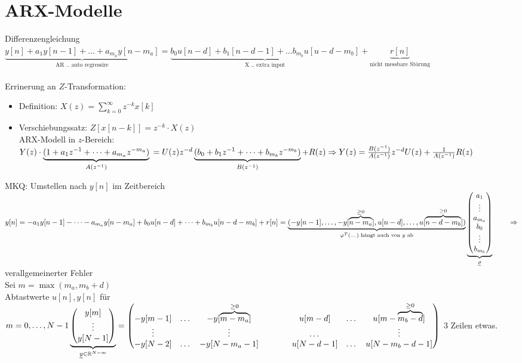 \documentclass[ngerman]{tudscrreprt}
\begin{document}
\section{ARX-Modelle} 
Differenzengleichung \\$\underbrace{y[n] + a_1 y[n-1] + \dots + a_{m_a} y [n-m_a]}_{\text{AR .. auto regressire}} = \underbrace{b_0 u [n-d] + b_1 [n-d -1] + \dots b_{m_b} u[u-d-m_b]}_{\text{X .. extra input}} + \underbrace{r[n]}_{\text{nicht messbare Störung}}$\\
\\Errinerung an $Z$-Transformation:
\begin{itemize}
\item Definition: $X(z) = \sum\limits_{k=0}^{\infty} z^{-k} x[k]$
\item Verschiebungssatz: $Z[x[n-k]] = z^{-k} \cdot X(z)$\\
ARX-Modell in $z$-Bereich: $Y(z)\cdot \underbrace{(1+ a_1 z^{-1} + \dots + a_{m_a} z^{-m_a})}_{A(z^{-1})}\\ =U(z) z^{-d} \underbrace{(b_0 + b_1 z^{-1} + \dots + b_{m_b} z^{-m_b})}_{B(z^{-1})} + R(z) \\ 
\Rightarrow Y(z) = \frac{B(z^{-1})}{A(z^{-1})} z^{-d} U(z) + \frac{1}{A(z^{-1})} R(z)$
\end{itemize}
MKQ: Umstellen nach $y[n]$ im Zeitbereich \\
$y[n] = -a_1 y[n-1] - \dots - a_{m_a} y [n-m_a] + b_0 u[n-d] + \dots + b_{m_b} u [n-d-m_b] + r[n] \\
= \underbrace{(-y[n-1],\dots, -y[\overbrace{n-m_a}^{\ge 0}],u[n-d],\dots, u[\overbrace{n-d-m_b}^{\ge 0}])}_{\varphi^T(\dots) \text{ hängt auch von $y$ ab}}
\underbrace{ 
\begin{pmatrix}
a_1\\
\vdots\\
a_{m_a}\\
b_0\\
\vdots\\
b_{m_b}
\end{pmatrix}}_{\underline \rho} \\
\qquad \Rightarrow$ verallgemeinerter Fehler\\
Sei $m = \max(m_a , m_b + d)$\\Abtastwerte $u[n], y[n]$ für $ m=0,\dots, N-1 \\
\underbrace{\begin{pmatrix}
y[m]\\
\vdots\\
y[N-1]
\end{pmatrix}}_{\underline y \in \mathbb{R}^{N-m}}=
\begin{pmatrix}
-y[m-1] &\dots& -y[\overbrace{m-m_a}^{\ge 0}] &\qquad& u[m-d] &\dots & u[m-\overbrace{m_b-d}^{\ge 0}]\\
\vdots &      &    \vdots &       \qquad & \dots&      &\vdots         \\
-y[N-2] & \dots & -y[N-m_a -1] &\qquad & u[N-d-1]&\dots & u[N-m_b -d- 1]
\end{pmatrix}
$ 
3 Zeilen etwas.
\end{document}
